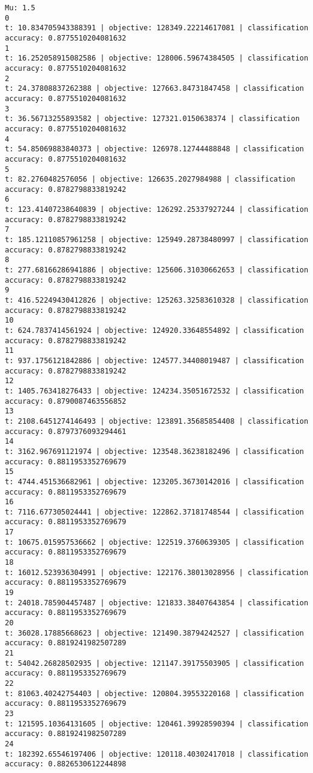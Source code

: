 \documentclass[11pt]{article}
\theoremstyle{remark}
\begin{document}
\begin{itemize}
\begin{verbatim}
Mu: 1.5
0
t: 10.834705943388391 | objective: 128349.22214617081 | classification accuracy: 0.8775510204081632
1
t: 16.252058915082586 | objective: 128006.59674384505 | classification accuracy: 0.8775510204081632
2
t: 24.37808837262388 | objective: 127663.84731847458 | classification accuracy: 0.8775510204081632
3
t: 36.56713255893582 | objective: 127321.0150638374 | classification accuracy: 0.8775510204081632
4
t: 54.85069883840373 | objective: 126978.12744488848 | classification accuracy: 0.8775510204081632
5
t: 82.2760482576056 | objective: 126635.2027984988 | classification accuracy: 0.8782798833819242
6
t: 123.41407238640839 | objective: 126292.25337927244 | classification accuracy: 0.8782798833819242
7
t: 185.12110857961258 | objective: 125949.28738480997 | classification accuracy: 0.8782798833819242
8
t: 277.68166286941886 | objective: 125606.31030662653 | classification accuracy: 0.8782798833819242
9
t: 416.52249430412826 | objective: 125263.32583610328 | classification accuracy: 0.8782798833819242
10
t: 624.7837414561924 | objective: 124920.33648554892 | classification accuracy: 0.8782798833819242
11
t: 937.1756121842886 | objective: 124577.34408019487 | classification accuracy: 0.8782798833819242
12
t: 1405.763418276433 | objective: 124234.35051672532 | classification accuracy: 0.8790087463556852
13
t: 2108.6451274146493 | objective: 123891.35685854408 | classification accuracy: 0.8797376093294461
14
t: 3162.967691121974 | objective: 123548.36238182496 | classification accuracy: 0.8811953352769679
15
t: 4744.451536682961 | objective: 123205.36730142016 | classification accuracy: 0.8811953352769679
16
t: 7116.677305024441 | objective: 122862.37181748544 | classification accuracy: 0.8811953352769679
17
t: 10675.015957536662 | objective: 122519.3760639305 | classification accuracy: 0.8811953352769679
18
t: 16012.523936304991 | objective: 122176.38013028956 | classification accuracy: 0.8811953352769679
19
t: 24018.785904457487 | objective: 121833.38407643854 | classification accuracy: 0.8811953352769679
20
t: 36028.17885668623 | objective: 121490.38794242527 | classification accuracy: 0.8819241982507289
21
t: 54042.26828502935 | objective: 121147.39175503905 | classification accuracy: 0.8811953352769679
22
t: 81063.40242754403 | objective: 120804.39553220168 | classification accuracy: 0.8811953352769679
23
t: 121595.10364131605 | objective: 120461.39928590394 | classification accuracy: 0.8819241982507289
24
t: 182392.65546197406 | objective: 120118.40302417018 | classification accuracy: 0.8826530612244898



\end{verbatim}
\end{itemize}
\end{document}
